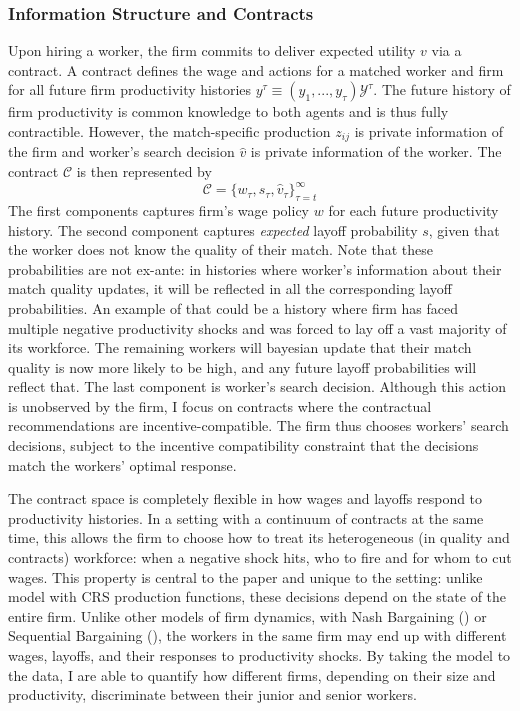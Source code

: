 \subsubsection*{Information Structure and Contracts}
Upon hiring a worker, the firm commits to deliver expected utility $v$ via a contract. A contract defines the wage and
actions for a matched worker and firm for all future firm productivity histories $y^\tau\equiv (y_1,...,y_\tau)\mathcal{Y}^{\tau}$. The future history of firm productivity is common knowledge to both agents and is thus fully contractible. However, the match-specific production $z_{ij}$ is private information of the firm and worker's search decision $\hat{v}$ is private information of the worker. The contract $\mathcal{C}$ is then represented by 
\begin{equation}
\mathcal{C}=\{w_{\tau},s_{\tau},\hat{v}_\tau\}_{\tau=t}^\infty
\end{equation}
The first components captures firm's wage policy $w$ for each future productivity history. The second component captures \textit{expected} layoff probability $s$, given that the worker does not know the quality of their match. Note that these probabilities are not ex-ante: in histories where worker's information about their match quality updates, it will be reflected in all the corresponding layoff probabilities. An example of that could be a history where firm has faced multiple negative productivity shocks and was forced to lay off a vast majority of its workforce. The remaining workers will bayesian update that their match quality is now more likely to be high, and any future layoff probabilities will reflect that. 
The last component is worker's search decision. Although this action is unobserved by the firm, I focus on contracts where the contractual recommendations are incentive-compatible. The firm thus chooses workers’ search decisions, subject to the incentive compatibility constraint that the decisions match the workers’ optimal response.

The contract space is completely flexible in how wages and layoffs respond to productivity histories. In a setting with a continuum of contracts at the same time, this allows the firm to choose how to treat its heterogeneous (in quality and contracts) workforce: when a negative shock hits, who to fire and for whom to cut wages. This property is central to the paper and unique to the setting: unlike model with CRS production functions, these decisions depend on the state of the entire firm. Unlike other models of firm dynamics, with Nash Bargaining (\textcite{mccrary2022}) or Sequential Bargaining (\textcite{bilal2022}), the workers in the same firm may end up with different wages, layoffs, and their responses to productivity shocks. By taking the model to the data, I are able to quantify how different firms, depending on their size and productivity, discriminate between their junior and senior workers.
